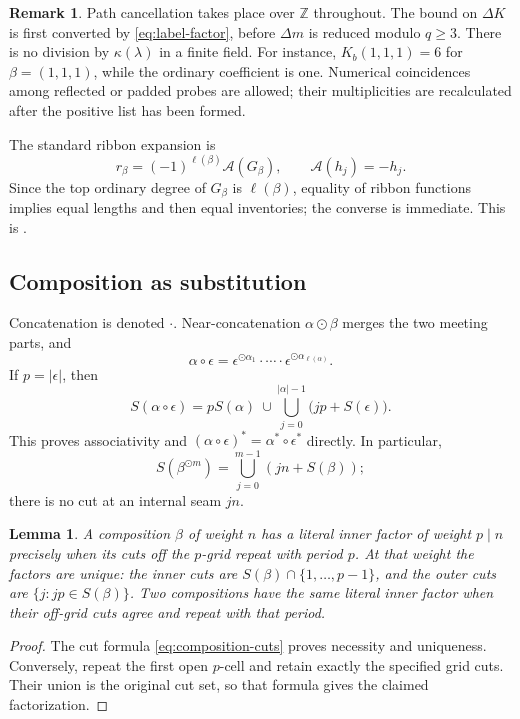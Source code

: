\documentclass[11pt,a4paper]{amsart}
\numberwithin{equation}{section}
\theoremstyle{plain}
\newtheorem{lemma}[theorem]{Lemma}
\theoremstyle{definition}
\newtheorem{remark}[theorem]{Remark}
\newcommand{\Z}{\mathbb Z}
\begin{document}
\begin{remark}\label{rem:modular-order}
Path cancellation takes place over \(\Z\) throughout.  The bound on
\(\Delta K\) is first converted by \eqref{eq:label-factor}, before
\(\Delta m\) is reduced modulo \(q\ge3\).  There is no division by
\(\kappa(\lambda)\) in a finite field.
For instance, \(K_b(1,1,1)=6\) for \(\beta=(1,1,1)\), while the ordinary
coefficient is one.  Numerical coincidences among reflected or padded
probes are allowed; their multiplicities are recalculated after the
positive list has been formed.
\end{remark}

The standard ribbon expansion \cite[Proposition~2.1]{Billera2006DecomposableCompositions} is
\begin{equation}\label{eq:ribbon-expansion}
r_\beta=(-1)^{\ell(\beta)}\mathcal A(G_\beta),
\qquad \mathcal A(h_j)=-h_j.
\end{equation}
Since the top ordinary degree of \(G_\beta\) is \(\ell(\beta)\), equality of
ribbon functions implies equal lengths and then equal inventories; the
converse is immediate.  This is \cite[Theorem~2.6]{Billera2006DecomposableCompositions}.

\subsection{Composition as substitution}
Concatenation is denoted \(\cdot\).  Near-concatenation \(\alpha\odot\beta\)
merges the two meeting parts, and
\[
\alpha\circ\epsilon
=\epsilon^{\odot\alpha_1}\cdot\cdots\cdot
\epsilon^{\odot\alpha_{\ell(\alpha)}}.
\]
If \(p=|\epsilon|\), then
\begin{equation}\label{eq:composition-cuts}
S(\alpha\circ\epsilon)
=pS(\alpha)\ \cup\!
\bigcup_{j=0}^{|\alpha|-1}\bigl(jp+S(\epsilon)\bigr).
\end{equation}
This proves associativity and
\((\alpha\circ\epsilon)^*=\alpha^*\circ\epsilon^*\) directly.
In particular,
\[
S(\beta^{\odot m})=\bigcup_{j=0}^{m-1}(jn+S(\beta));
\]
there is no cut at an internal seam \(jn\).

\begin{lemma}\label{lem:literal-factor}
A composition \(\beta\) of weight \(n\) has a literal inner factor of weight \(p\mid n\) precisely
when its cuts off the \(p\)-grid repeat with period \(p\).  At that
weight the factors are unique: the inner cuts are
\(S(\beta)\cap\{1,\ldots,p-1\}\), and the outer cuts are
\(\{j:jp\in S(\beta)\}\).  Two compositions have the same literal
inner factor when their off-grid cuts agree and repeat with that period.
\end{lemma}
\begin{proof}
The cut formula \eqref{eq:composition-cuts} proves necessity and
uniqueness.  Conversely, repeat the first open \(p\)-cell and retain
exactly the specified grid cuts.  Their union is the original cut set,
so that formula gives the claimed factorization.
\end{proof}
\end{document}
